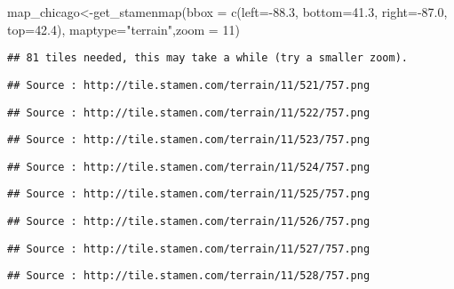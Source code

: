 \documentclass[
]{article}
\newenvironment{Shaded}{\begin{snugshade}}{\end{snugshade}}
\newcommand{\AttributeTok}[1]{\textcolor[rgb]{0.77,0.63,0.00}{#1}}
\newcommand{\DecValTok}[1]{\textcolor[rgb]{0.00,0.00,0.81}{#1}}
\newcommand{\FloatTok}[1]{\textcolor[rgb]{0.00,0.00,0.81}{#1}}
\newcommand{\FunctionTok}[1]{\textcolor[rgb]{0.00,0.00,0.00}{#1}}
\newcommand{\NormalTok}[1]{#1}
\newcommand{\OtherTok}[1]{\textcolor[rgb]{0.56,0.35,0.01}{#1}}
\newcommand{\SpecialCharTok}[1]{\textcolor[rgb]{0.00,0.00,0.00}{#1}}
\newcommand{\StringTok}[1]{\textcolor[rgb]{0.31,0.60,0.02}{#1}}
\begin{document}
\begin{Shaded}
\begin{Highlighting}[]
\NormalTok{map\_chicago}\OtherTok{\textless{}{-}}\FunctionTok{get\_stamenmap}\NormalTok{(}\AttributeTok{bbox =} \FunctionTok{c}\NormalTok{(}\AttributeTok{left=}\SpecialCharTok{{-}}\FloatTok{88.3}\NormalTok{, }\AttributeTok{bottom=}\FloatTok{41.3}\NormalTok{, }\AttributeTok{right=}\SpecialCharTok{{-}}\FloatTok{87.0}\NormalTok{, }\AttributeTok{top=}\FloatTok{42.4}\NormalTok{), }\AttributeTok{maptype=}\StringTok{"terrain"}\NormalTok{,}\AttributeTok{zoom =} \DecValTok{11}\NormalTok{)}
\end{Highlighting}
\end{Shaded}

\begin{verbatim}
## 81 tiles needed, this may take a while (try a smaller zoom).
\end{verbatim}

\begin{verbatim}
## Source : http://tile.stamen.com/terrain/11/521/757.png
\end{verbatim}

\begin{verbatim}
## Source : http://tile.stamen.com/terrain/11/522/757.png
\end{verbatim}

\begin{verbatim}
## Source : http://tile.stamen.com/terrain/11/523/757.png
\end{verbatim}

\begin{verbatim}
## Source : http://tile.stamen.com/terrain/11/524/757.png
\end{verbatim}

\begin{verbatim}
## Source : http://tile.stamen.com/terrain/11/525/757.png
\end{verbatim}

\begin{verbatim}
## Source : http://tile.stamen.com/terrain/11/526/757.png
\end{verbatim}

\begin{verbatim}
## Source : http://tile.stamen.com/terrain/11/527/757.png
\end{verbatim}

\begin{verbatim}
## Source : http://tile.stamen.com/terrain/11/528/757.png
\end{verbatim}
\end{document}
